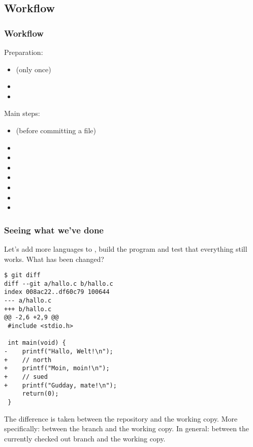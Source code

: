 \subsection{Workflow}
\begin{frame}[fragile]
\frametitle{Workflow}

Preparation:
\begin{itemize}
    \item {} (only once)
    \item {}
    \item {}
\end{itemize}

Main steps:
\begin{itemize}
    \item {} (before committing a file)
    \item {}
    \item {}
    \item {}
    \item {}
    \item {}
    \item {}
    \item {}
\end{itemize}

\end{frame}

\begin{frame}[fragile]
\frametitle{Seeing what we've done}
\vspace*{-3mm}
Let's add more languages to , build the program and test
that everything still works.  What has been changed?
\begin{lstlisting}[basicstyle=\tiny\ttfamily\color{black}]
$ git diff
diff --git a/hallo.c b/hallo.c
index 008ac22..df60c79 100644
--- a/hallo.c
+++ b/hallo.c
@@ -2,6 +2,9 @@
 #include <stdio.h>
 
 int main(void) {
-    printf("Hallo, Welt!\n");
+    // north
+    printf("Moin, moin!\n");
+    // sued
+    printf("Gudday, mate!\n");
     return(0);
 }
\end{lstlisting}

The difference is taken between the repository and the working copy.  More
specifically: between the  branch and the working copy.  In
general: between the currently checked out branch and the working copy.

\end{frame}

